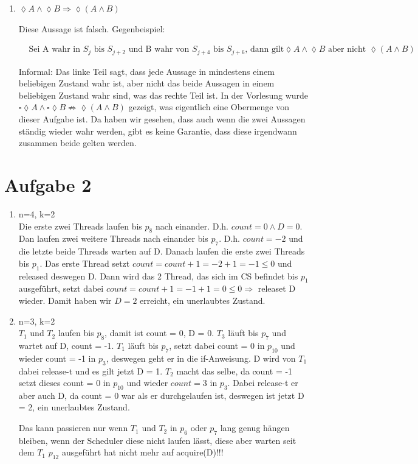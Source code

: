 \begin{enumerate}
\item $\lozenge A \land \lozenge B \Rightarrow \lozenge (A \land B)$

Diese Aussage ist falsch. Gegenbeispiel:

\begin{align*}
	& \text{Sei A wahr in $S_j$ bis $S_{j+2}$ und B wahr von $S_{j+4}$ bis $S_{j+6}$, dann gilt} \lozenge A \land \lozenge B \text{ aber nicht } \lozenge(A \land B)
\end{align*}

Informal: Das linke Teil sagt, dass jede Aussage in mindestens einem beliebigen Zustand wahr ist, aber nicht das beide Aussagen in einem beliebigen Zustand wahr sind, was das rechte Teil ist. In der Vorlesung wurde $\square \lozenge A \land \square \lozenge B \not\Rightarrow \lozenge (A \land B)$ gezeigt, was eigentlich eine Obermenge von dieser Aufgabe ist. Da haben wir gesehen, dass auch wenn die zwei Aussagen ständig wieder wahr werden, gibt es keine Garantie, dass diese irgendwann zusammen beide gelten werden.

\end{enumerate}


\section*{Aufgabe 2}

\begin{enumerate}

\item n=4, k=2 \\

Die erste zwei Threads laufen bis $p_8$ nach einander. D.h. $ count=0 \land D = 0$. Dan laufen zwei weitere Threads nach einander bis $p_7$. D.h. $count=-2$ und die letzte beide Threads warten auf D. Danach laufen die erste zwei Threads bis $p_1$. Das erste Thread setzt $count = count + 1 = -2 + 1 = -1 \leq 0$ und released deswegen D. Dann wird das 2 Thread, das sich im CS befindet bis $p_1$ ausgeführt, setzt dabei $count = count+1 = -1 + 1 = 0 \leq 0 \Rightarrow$ releaset D wieder. Damit haben wir $D=2$ erreicht, ein unerlaubtes Zustand. 

\item n=3, k=2 \\

$T_1$ und $T_2$ laufen bis $p_8$, damit ist count = 0, D = 0. $T_3$ läuft bis $p_7$ und wartet auf D, count = -1. $T_1$ läuft bis $p_7$, setzt dabei count = 0 in $p_10$ und wieder count = -1 in $p_3$, deswegen geht er in die if-Anweisung. D wird von $T_1$ dabei release-t und es gilt jetzt D = 1. $T_2$ macht das selbe, da count = -1 setzt dieses count = 0 in $p_10$ und wieder $count=3$ in $p_3$. Dabei release-t er aber auch D, da count = 0 war als er durchgelaufen ist, deswegen ist jetzt D = 2, ein unerlaubtes Zustand.

Das kann passieren nur wenn $T_1$ und $T_2$ in $p_6$ oder $p_7$ lang genug hängen bleiben, wenn der Scheduler diese nicht laufen lässt, diese aber warten seit dem $T_1$ $p_12$ ausgeführt hat nicht mehr auf acquire(D)!!!

\end{enumerate}

